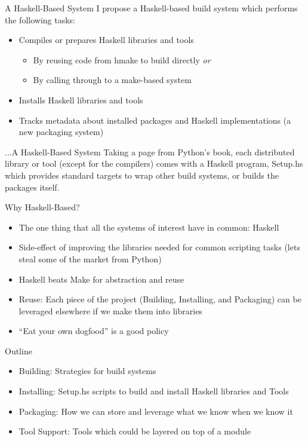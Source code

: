 \documentclass[pdf,rico,slideColor,colorBG]{prosper}
\begin{document}
\begin{slide}{A Haskell-Based System}
I propose a Haskell-based build system which performs the following tasks:
\begin{itemize}
  \item Compiles or prepares Haskell libraries and tools
  \begin{itemize}
    \item By reusing code from hmake to build directly \emph{or}
    \item By calling through to a make-based system
  \end{itemize}
  \item Installs Haskell libraries and tools
  \item Tracks metadata about installed packages and Haskell implementations (a new packaging system)
\end{itemize}
\end{slide}

\begin{slide}{...A Haskell-Based System}
Taking a page from Python's book, each distributed library or tool
(except for the compilers) comes with a Haskell program, Setup.hs
which provides standard targets to wrap other build systems, or builds
the packages itself.
\end{slide}

\begin{slide}{Why Haskell-Based?}
  \begin{itemize}
    \item The one thing that all the systems of interest have in common: Haskell
    \item Side-effect of improving the libraries needed for common scripting tasks (lets steal some of the market from Python)
    \item Haskell beats Make for abstraction and reuse
    \item Reuse: Each piece of the project (Building, Installing, and Packaging) can be leveraged elsewhere if we make them into libraries
    \item ``Eat your own dogfood'' is a good policy
  \end{itemize}

\end{slide}

\begin{slide}{Outline}
\begin{itemize}
  \item Building: Strategies for build systems
  \item Installing: Setup.hs scripts to build and install Haskell libraries and Tools
  \item Packaging: How we can store and leverage what we know when we know it
  \item Tool Support: Tools which could be layered on top of a module
\end{itemize}
\end{slide}
\end{document}
